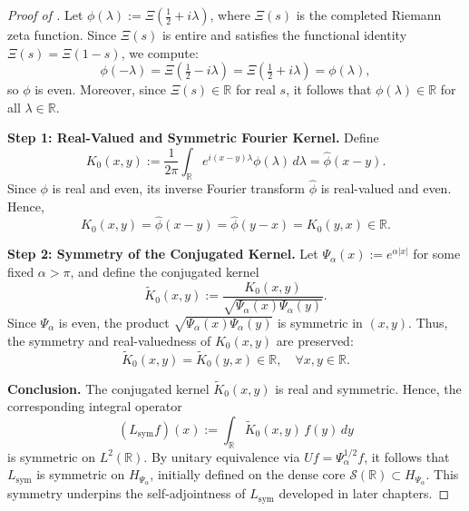 \begin{proof}[Proof of ]
Let \( \phi(\lambda) := \Xi\left( \tfrac{1}{2} + i\lambda \right) \), where \( \Xi(s) \) is the completed Riemann zeta function. Since \( \Xi(s) \) is entire and satisfies the functional identity \( \Xi(s) = \Xi(1 - s) \), we compute:
\[
\phi(-\lambda) = \Xi\left( \tfrac{1}{2} - i\lambda \right) = \Xi\left( \tfrac{1}{2} + i\lambda \right) = \phi(\lambda),
\]
so \( \phi \) is even. Moreover, since \( \Xi(s) \in \mathbb{R} \) for real \( s \), it follows that \( \phi(\lambda) \in \mathbb{R} \) for all \( \lambda \in \mathbb{R} \).

\medskip
\noindent\textbf{Step 1: Real-Valued and Symmetric Fourier Kernel.}
Define
\[
K_0(x,y) := \frac{1}{2\pi} \int_{\mathbb{R}} e^{i(x - y)\lambda} \phi(\lambda)\, d\lambda = \widehat{\phi}(x - y).
\]
Since \( \phi \) is real and even, its inverse Fourier transform \( \widehat{\phi} \) is real-valued and even. Hence,
\[
K_0(x,y) = \widehat{\phi}(x - y) = \widehat{\phi}(y - x) = K_0(y,x) \in \mathbb{R}.
\]

\medskip
\noindent\textbf{Step 2: Symmetry of the Conjugated Kernel.}
Let \( \Psi_\alpha(x) := e^{\alpha |x|} \) for some fixed \( \alpha > \pi \), and define the conjugated kernel
\[
\widetilde{K}_0(x,y) := \frac{K_0(x,y)}{\sqrt{\Psi_\alpha(x)\Psi_\alpha(y)}}.
\]
Since \( \Psi_\alpha \) is even, the product \( \sqrt{\Psi_\alpha(x)\Psi_\alpha(y)} \) is symmetric in \( (x,y) \). Thus, the symmetry and real-valuedness of \( K_0(x,y) \) are preserved:
\[
\widetilde{K}_0(x,y) = \widetilde{K}_0(y,x) \in \mathbb{R}, \quad \forall x, y \in \mathbb{R}.
\]

\medskip
\noindent\textbf{Conclusion.}
The conjugated kernel \( \widetilde{K}_0(x,y) \) is real and symmetric. Hence, the corresponding integral operator
\[
(L_{\mathrm{sym}} f)(x) := \int_{\mathbb{R}} \widetilde{K}_0(x,y)\, f(y)\, dy
\]
is symmetric on \( L^2(\mathbb{R}) \). By unitary equivalence via \( U f = \Psi_\alpha^{1/2} f \), it follows that \( L_{\mathrm{sym}} \) is symmetric on \( H_{\Psi_\alpha} \), initially defined on the dense core \( \mathcal{S}(\mathbb{R}) \subset H_{\Psi_\alpha} \). This symmetry underpins the self-adjointness of \( L_{\mathrm{sym}} \) developed in later chapters.
\end{proof}
